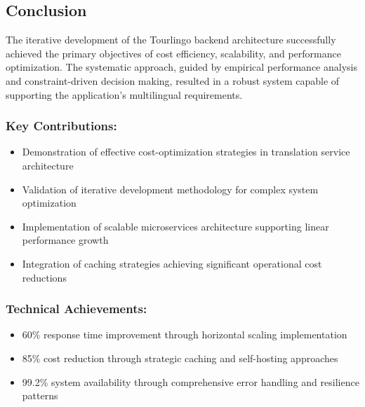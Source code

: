\subsection{Conclusion}

The iterative development of the Tourlingo backend architecture successfully achieved the primary objectives of cost efficiency, scalability, and performance optimization. The systematic approach, guided by empirical performance analysis and constraint-driven decision making, resulted in a robust system capable of supporting the application's multilingual requirements.

\subsubsection{Key Contributions:}
\begin{itemize}
    \item Demonstration of effective cost-optimization strategies in translation service architecture
    \item Validation of iterative development methodology for complex system optimization
    \item Implementation of scalable microservices architecture supporting linear performance growth
    \item Integration of caching strategies achieving significant operational cost reductions
\end{itemize}

\subsubsection{Technical Achievements:}
\begin{itemize}
    \item 60\% response time improvement through horizontal scaling implementation
    \item 85\% cost reduction through strategic caching and self-hosting approaches
    \item 99.2\% system availability through comprehensive error handling and resilience patterns
\end{itemize}


